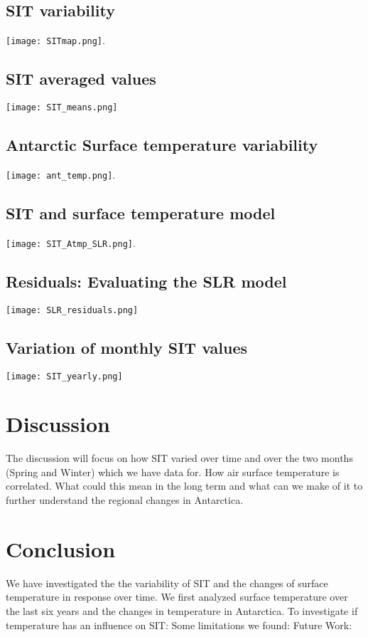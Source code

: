 \documentclass{article}
\begin{document}
\subsection{SIT variability}
\texttt{[image: SITmap.png]}.
\subsection{SIT averaged values}
\texttt{[image: SIT\_means.png]}
\subsection{ Antarctic Surface temperature variability}
\texttt{[image: ant\_temp.png]}.
\subsection{SIT and surface temperature model }
\texttt{[image: SIT\_Atmp\_SLR.png]}.
\subsection{Residuals: Evaluating the SLR model}
\texttt{[image: SLR\_residuals.png]}
\subsection{Variation of monthly SIT values}
\texttt{[image: SIT\_yearly.png]}






\section{Discussion}
The discussion will focus on how SIT varied over time and over the two months (Spring and Winter) which we have data for. How air surface temperature is correlated. What could this mean in the long term and what can we make of it to further understand the regional changes in Antarctica. 

\section{Conclusion}
We have investigated the the variability of SIT and the changes of surface temperature in response over time. 
We first analyzed surface temperature over the last six years and the changes in temperature in Antarctica.\newline
To investigate if temperature has an influence on SIT: \newline
Some limitations we found: \newline
Future Work:


\end{document}
